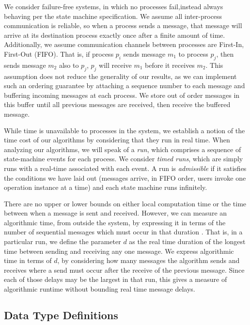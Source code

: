 \documentclass[a4paper,anonymous,USenglish]{lipics-v2021}
\theoremstyle{definition}
\begin{document}
We consider failure-free systems, in which no processes fail,instead always behaving per the state machine specification.  We assume all inter-process communication is reliable, so when a process sends a message, that message will arrive at its destination process exactly once after a finite amount of time.  Additionally, we assume communication channels between processes are First-In, First-Out (FIFO).  That is, if process $p_i$ sends message $m_1$ to process $p_j$, then sends message $m_2$ also to $p_j$, $p_j$ will receive $m_1$ before it receives $m_2$.  This assumption does not reduce the generality of our results, as we can implement such an ordering guarantee by attaching a sequence number to each message and buffering incoming messages at each process.  We store out of order messages in this buffer until all previous messages are received, then receive the buffered message.

While time is unavailable to processes in the system, we establish a notion of the time cost of our algorithms by considering that they run in real time.  When analyzing our algorithms, we will speak of a \emph{run}, which comprises a sequence of state-machine events for each process.  We consider \emph{timed runs}, which are simply runs with a real-time associated with each event.  A run is \emph{admissible} if it satisfies the conditions we have laid out (messages arrive, in FIFO order, users invoke one operation instance at a time) and each state machine runs infinitely.

There are no upper or lower bounds on either local computation time or the time between when a message is sent and received.  However, we can measure an algorithmic time, from outside the system, by expressing it in terms of the number of sequential messages which must occur in that duration \cite{AttiyaWelch04}.  That is, in a particular run, we define the parameter $d$ as the real time duration of the longest time between sending and receiving any one message.  We express algorithmic time in terms of $d$, by considering how many messages the algorithm sends and receives where a send must occur after the receive of the previous message.  Since each of those delays may be the largest in that run, this gives a measure of algorithmic runtime without bounding real time message delays.  

\subsection{Data Type Definitions}
\end{document}
